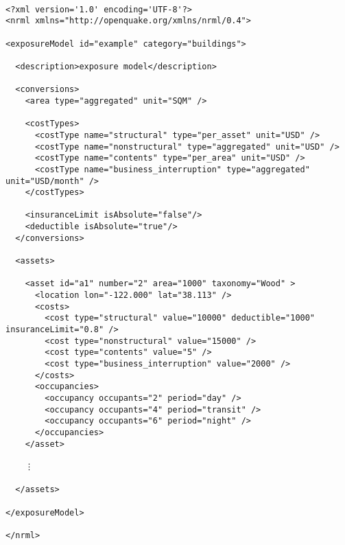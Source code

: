 \begin{verbatim}

<?xml version='1.0' encoding='UTF-8'?>
<nrml xmlns="http://openquake.org/xmlns/nrml/0.4">

<exposureModel id="example" category="buildings">
 
  <description>exposure model</description>

  <conversions>
    <area type="aggregated" unit="SQM" />
    
    <costTypes>
      <costType name="structural" type="per_asset" unit="USD" />
      <costType name="nonstructural" type="aggregated" unit="USD" />
      <costType name="contents" type="per_area" unit="USD" />
      <costType name="business_interruption" type="aggregated" unit="USD/month" />
    </costTypes>

    <insuranceLimit isAbsolute="false"/>
    <deductible isAbsolute="true"/>
  </conversions>

  <assets>

    <asset id="a1" number="2" area="1000" taxonomy="Wood" >
      <location lon="-122.000" lat="38.113" />
      <costs>
        <cost type="structural" value="10000" deductible="1000" insuranceLimit="0.8" />
        <cost type="nonstructural" value="15000" />
        <cost type="contents" value="5" />
        <cost type="business_interruption" value="2000" />
      </costs>
      <occupancies>
        <occupancy occupants="2" period="day" />
        <occupancy occupants="4" period="transit" />
        <occupancy occupants="6" period="night" />
      </occupancies>
    </asset>

    ⋮

  </assets>

</exposureModel>

</nrml>

\end{verbatim}
